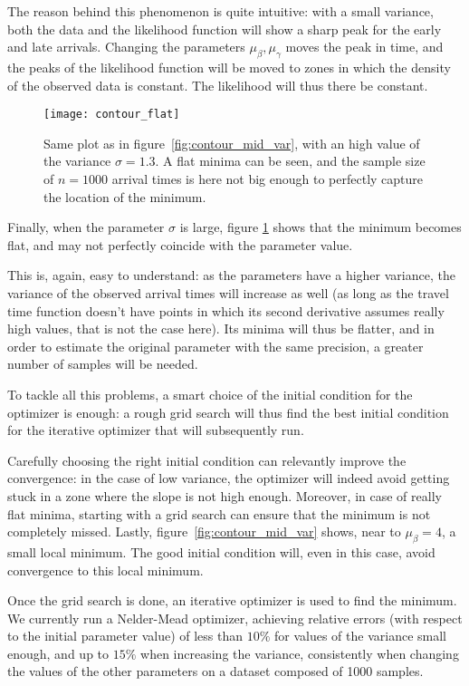 The reason behind this phenomenon is quite intuitive:
with a small variance, both the data and the likelihood function will show a sharp peak for the early and late arrivals.
Changing the parameters \(\mu_\beta, \mu_\gamma\) moves the peak in time,
and the peaks of the likelihood function will be moved to zones in which the density of the observed data is constant.
The likelihood will thus there be constant.

\begin{figure}
  \centering
  \texttt{[image: contour\_flat]}
  \caption{Same plot as in figure~\ref{fig:contour_mid_var},
    with an high value of the variance \(\sigma = 1.3\).
  A flat minima can be seen, and the sample size of \(n = 1000\) arrival times is here not big enough to perfectly capture the location of the minimum.}
  \label{fig:contour_high_var}
\end{figure}

Finally, when the parameter \(\sigma\) is large,
figure \ref{fig:contour_high_var} shows that the minimum becomes flat,
and may not perfectly coincide with the parameter value.

This is, again, easy to understand:
as the parameters have a higher variance,
the variance of the observed arrival times will increase as well
(as long as the travel time function doesn't have points in which its second derivative assumes really high values, that is not the case here).
Its minima will thus be flatter,
and in order to estimate the original parameter with the same precision,
a greater number of samples will be needed.

To tackle all this problems, a smart choice of the initial condition for the optimizer is enough:
a rough grid search will thus find the best initial condition for the iterative optimizer that will subsequently run.

Carefully choosing the right initial condition can relevantly improve the convergence:
in the case of low variance,
the optimizer will indeed avoid getting stuck in a zone where the slope is not high enough.
Moreover, in case of really flat minima,
starting with a grid search can ensure that the minimum is not completely missed.
Lastly, figure~\ref{fig:contour_mid_var} shows, near to \(\mu_\beta = 4\),
a small local minimum.
The good initial condition will, even in this case, avoid convergence to this local minimum.

Once the grid search is done,
an iterative optimizer is used to find the minimum.
We currently run a Nelder-Mead optimizer,
achieving relative errors (with respect to the initial parameter value)
of less than \(10\%\) for values of the variance small enough,
and up to \(15\%\) when increasing the variance,
consistently when changing the values of the other parameters on a dataset composed of 1000 samples.

